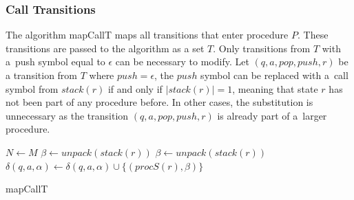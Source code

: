        \subsubsection*{Call Transitions}
            The algorithm mapCallT maps all transitions that enter procedure $P$. These transitions are passed to the algorithm as a set $T$. Only transitions from $T$ with a~push symbol equal to $\epsilon$ can be necessary to modify. Let $(q, a, pop, push, r)$ be a transition from $T$ where $push = \epsilon$, the $push$ symbol can be replaced with a~call symbol from $stack(r)$ if and only if $|stack(r)| = 1$, meaning that state $r$ has not been part of any procedure before. In other cases, the substitution is unnecessary as the transition $(q, a, pop, push, r)$ is already part of a~larger procedure.

            \begin{algorithm}
                \footnotesize
                \DontPrintSemicolon
                \setcounter{AlgoLine}{0}

                $N \leftarrow M$\;
                {
                    {
                        $\beta \leftarrow unpack(stack(r))$\;
                    }
                    \ElseIf{$\alpha \neq \epsilon \land \beta = \epsilon$}
                    {
                        $\beta \leftarrow unpack(stack(r))$
                    }
                    $\delta(q, a, \alpha) \leftarrow \delta(q, a, \alpha) \cup \{(procS(r), \beta)\}$\;
                }


                \normalsize
                \caption{mapCallT}
                \label{alg:call}
            \end{algorithm}

